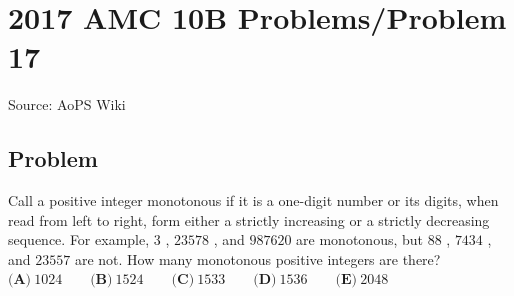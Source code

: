 \documentclass[12pt]{article}
\begin{document}
\section*{{2017 AMC 10B Problems/Problem 17}}
Source: AoPS Wiki

\subsection*{Problem}
Call a positive integer monotonous if it is a one-digit number or its digits, when read from left to right, form either a strictly increasing or a strictly decreasing sequence. For example, $3$ , $23578$ , and $987620$ are monotonous, but $88$ , $7434$ , and $23557$ are not. How many monotonous positive integers are there? $\textbf{(A)}\ 1024\qquad\textbf{(B)}\ 1524\qquad\textbf{(C)}\ 1533\qquad\textbf{(D)}\ 1536\qquad\textbf{(E)}\ 2048$
\end{document}
